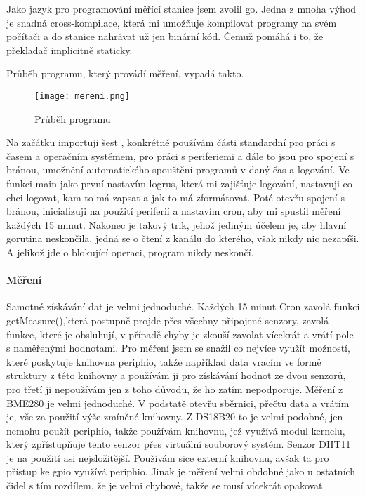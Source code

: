 Jako jazyk pro programování měřící stanice jsem zvolil \gls{go}. Jedna z mnoha výhod je snadná \gls{cross-kompilace}, 
která mi umožňuje kompilovat programy na svém počítači a do stanice nahrávat už jen binární kód. Čemuž pomáhá i to, že 
překladač implicitně  staticky.

Průběh programu, který provádí měření, vypadá takto.

\begin{figure}[H]
    \centering
    \texttt{[image: mereni.png]}
    \caption{Průběh programu}
\end{figure}

Na začátku importuji šest , konkrétně používám části standardní  
pro práci s časem a operačním systémem,  pro práci s periferiemi a dále to jsou 
 pro spojení s bránou, umožnění automatického spouštění programů v daný čas a logování. Ve 
funkci main jako první nastavím  logrus, která mi zajišťuje logování, nastavuji co chci 
logovat, kam to má zapsat a jak to má zformátovat. Poté otevřu spojení s bránou, inicializuji 
 na použití periferií a nastavím cron, aby mi spustil měření každých 15 minut. Nakonec je 
takový trik, jehož jediným účelem je, aby hlavní \gls{gorutina} neskončila, jedná se o čtení z kanálu do kterého, však 
nikdy nic nezapíši. A jelikož jde o blokující operaci, program nikdy neskončí.

\paragraph*{Měření}
Samotné získávání dat je velmi jednoduché. Každých 15 minut Cron zavolá funkci getMeasure(),která postupně projde přes 
všechny připojené senzory, zavolá funkce, které je obsluhují, v případě chyby je zkouší zavolat vícekrát a vrátí pole 
s naměřenými hodnotami. Pro měření jsem se snažil co nejvíce využít možností, které poskytuje  \gls{knihovna} 
\gls{periphio}, takže například data vracím ve formě struktury z této knihovny a používám ji pro získávání hodnot ze 
dvou senzorů, pro třetí ji nepoužívám jen z toho důvodu, že ho zatím nepodporuje. Měření z BME280 je velmi jednoduché. 
V podstatě otevřu sběrnici, přečtu data a vrátím je, vše za použití výše zmíněné knihovny. Z DS18B20 to je velmi 
podobné, jen nemohu použít \gls{periphio}, takže používám knihovnu, jež využívá modul kernelu, který zpřístupňuje tento 
senzor přes virtuální souborový systém. Senzor DHT11 je na použití asi nejsložitější. Používám sice externí knihovnu, 
avšak ta pro přístup ke \acrshort{gpio} využívá \gls{periphio}. Jinak je měření velmi obdobné jako u ostatních čidel 
s tím rozdílem, že je velmi chybové, takže se musí vícekrát opakovat.

